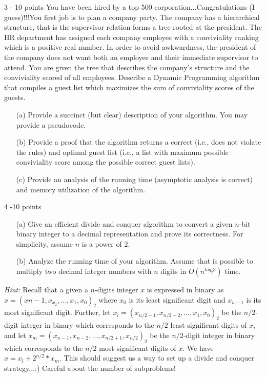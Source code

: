 \documentclass{common/cs157}
\begin{document}
\begin{problem}{3 - 10 points}
You have been hired by a top 500 corporation...Congratulations (I guess)!!!You first job is to plan a company party. The company has a hierarchical structure, that is the supervisor relation forms a tree rooted at the president. The HR department has assigned each company employee with a conviviality ranking which is a positive real number. In order to avoid awkwardness, the president of the company does not want both an employee and their immediate supervisor to attend. You are given the tree that describes the company's structure and the conviviality scored of all employees. Describe a Dynamic Programming algorithm that compiles a guest list which maximizes the sum of conviviality scores of the guests.
\begin{enumerate}
    \item[(a)] Provide a succinct (but clear) description of your algorithm. You may provide a pseudocode.
    \item[(b)] Provide a proof that the algorithm returns a correct (i.e., does not violate the rules) and optimal guest list (i.e., a list with maximum possible conviviality score among the possible correct guest lists).
    \item[(c)] Provide an analysis of the running time (asymptotic analysis is correct) and memory utilization of the algorithm.
\end{enumerate}

\end{problem}

\begin{problem}{4 -10 points}
\begin{enumerate}
    \item[(a)]Give an efficient divide and conquer algorithm to convert a given $n$-bit binary integer to a decimal representation and prove its correctness. For simplicity, assume $n$ is a power of $2$.
    \item[(b)] Analyze the running time of your algorithm. Assume that is possible to multiply two decimal integer numbers with $n$ digits in $O(n^{log_2 3})$ time. 
\end{enumerate}

\emph{Hint:} Recall that a given a $n$-digits integer $x$ is expressed in binary as $x=(x{n-1},x_{x_2},\ldots, x_1,x_0)_2$
where $x_0$ is its least significant digit and $x_{n-1}$ is its most significant digit. Further, let $x_l=(x_{n/2-1},x_{n/2-2},\ldots,x_1,x_0)_2$ be the $n/2$-digit integer in binary which corresponds to the $n/2$ least significant digits of $x$, and let $x_m=(x_{n-1},x_{n-2},\ldots,x_{n/2+1},x_{n/2})_2$ be the $n/2$-digit integer in binary which corresponds to the $n/2$ most significant digits of $x$. We have $x=x_l+2^{n/2}*x_m$. This should suggest us a way to set up a divide and conquer strategy...:) Careful about the number of subproblems!
\end{problem}
\end{document}
